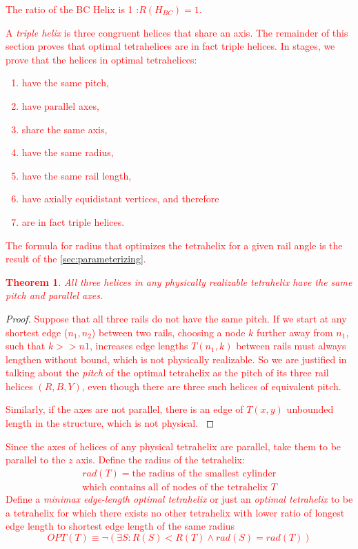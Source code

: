 \documentclass[twocolumn,10pt]{asme2ej}
\newtheorem{theorem}{Theorem}
\newcommand{\highlighttext}[1] {\textcolor{red}{#1}}
\begin{document}
\highlighttext{
  The ratio of the BC Helix is 1 :$ R(H_{BC}) = 1$.
  }
\highlighttext{
A \emph{triple helix} is three congruent helices that share an axis. The remainder of this
section proves that
optimal tetrahelices are in fact triple helices.
In stages, we prove that the helices in optimal tetrahelices:
\begin{enumerate}
\item have the same pitch,
\item have parallel axes,
\item share the same axis,
\item have the same radius,
  \item have the same rail length,
  \item have axially equidistant vertices, and therefore
  \item are in fact triple helices.
\end{enumerate}
The formula for radius that optimizes the tetrahelix for a given rail angle
is the result of the \cref{sec:parameterizing}.
}

\highlighttext{
\begin{theorem}
  All three helices in any physically realizable tetrahelix have the same pitch and parallel axes.
  \label{thm:pitchandparallel}
\end{theorem}
}

\begin{proof}
\highlighttext{  
Suppose that all three rails do not have the same pitch.
If we start at any shortest edge ($n_1,n_2$) between
two rails, choosing a node $k$ 
further away from $n_1$, such that  $k >> n1$, increases edge lengths $T(n_1,k)$
between rails must always lengthen without bound,
which is not physically realizable.
So we are justified in talking about the
\emph{pitch} of 
the optimal tetrahelix as the pitch of its three rail helices $(R,B,Y)$, even though there are
three such helices of equivalent pitch.
}

\highlighttext{  
Similarly, if the axes are not parallel, there is an edge of $T(x,y)$
unbounded length in the structure, which is not physical.
}
\end{proof}

\highlighttext{  
Since the axes of helices of any physical tetrahelix are parallel, take
them to be parallel to the $z$ axis. Define the radius of the tetrahelix:
\begin{multline*}
rad(T) = \text{the radius of the smallest cylinder} \\
\text{which contains all of nodes of the tetrahelix } T
\end{multline*}
Define a \emph{minimax edge-length optimal tetrahelix} or just an
\emph{optimal tetrahelix} to be a tetrahelix for which there exists
no other tetrahelix with lower ratio of longest edge length to
shortest edge length of the same radius
\begin{equation}
  OPT(T) \equiv \neg (\exists S : R(S) < R(T) \wedge rad(S) = rad(T))
  \label{eq:optdef}
\end{equation}
}
\end{document}

